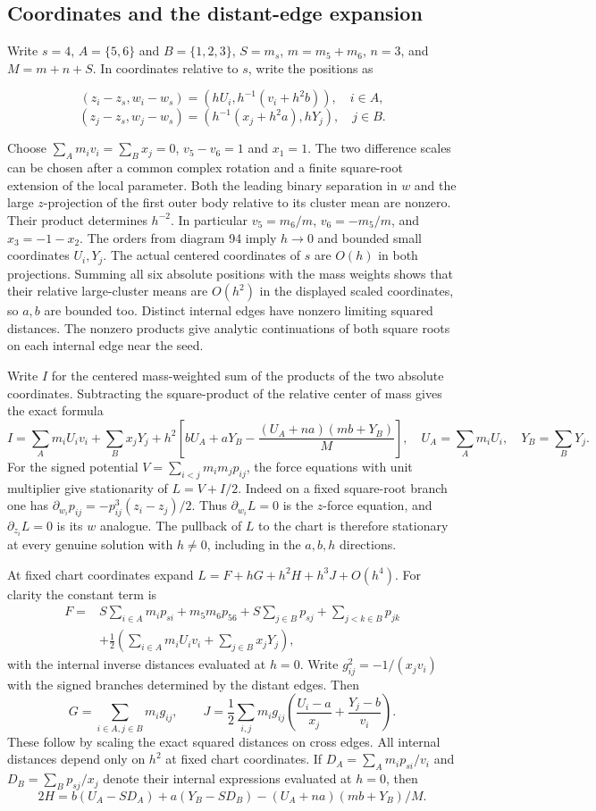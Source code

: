 \documentclass[11pt,letterpaper]{article}
\theoremstyle{definition}
\begin{document}
\subsection{Coordinates and the distant-edge expansion}
Write $s=4$, $A=\{5,6\}$ and $B=\{1,2,3\}$, $S=m_s$, $m=m_5+m_6$, $n=3$, and $M=m+n+S$. In coordinates relative to $s$, write the positions as

\[
(z_i-z_s,w_i-w_s)=(hU_i,h^{-1}(v_i+h^2b)),\quad i\in A,
\]
\[
(z_j-z_s,w_j-w_s)=(h^{-1}(x_j+h^2a),hY_j),\quad j\in B.
\]

Choose $\sum_A m_i v_i=\sum_B x_j=0$, $v_5-v_6=1$ and $x_1=1$. The two difference scales can be chosen after a common complex rotation and a finite square-root extension of the local parameter. Both the leading binary separation in $w$ and the large $z$-projection of the first outer body relative to its cluster mean are nonzero. Their product determines $h^{-2}$. In particular $v_5=m_6/m$, $v_6=-m_5/m$, and $x_3=-1-x_2$. The orders from diagram 94 imply $h\to0$ and bounded small coordinates $U_i,Y_j$. The actual centered coordinates of $s$ are $O(h)$ in both projections. Summing all six absolute positions with the mass weights shows that their relative large-cluster means are $O(h^2)$ in the displayed scaled coordinates, so $a,b$ are bounded too. Distinct internal edges have nonzero limiting squared distances. The nonzero products give analytic continuations of both square roots on each internal edge near the seed.

Write $I$ for the centered mass-weighted sum of the products of the two absolute coordinates. Subtracting the square-product of the relative center of mass gives the exact formula
\[
I=\sum_A m_i U_i v_i+\sum_B x_jY_j+
 h^2\left[bU_A+aY_B-\frac{(U_A+na)(mb+Y_B)}{M}\right],
\quad U_A=\sum_A m_iU_i,\quad Y_B=\sum_B Y_j.
\]
For the signed potential $V=\sum_{i<j}m_i m_jp_{ij}$, the force equations with unit multiplier give stationarity of $L=V+I/2$. Indeed on a fixed square-root branch one has $\partial_{w_i}p_{ij}=-p_{ij}^3(z_i-z_j)/2$. Thus $\partial_{w_i}L=0$ is the $z$-force equation, and $\partial_{z_i}L=0$ is its $w$ analogue. The pullback of $L$ to the chart is therefore stationary at every genuine solution with $h\ne0$, including in the $a,b,h$ directions.

At fixed chart coordinates expand $L=F+hG+h^2 H+h^3 J+O(h^4)$. For clarity the constant term is
\begin{align*}
 F={}& S\sum_{i\in A}m_i p_{si}+m_5m_6p_{56}
      +S\sum_{j\in B}p_{sj}+\sum_{j<k\in B}p_{jk}\\
    &+\tfrac12\left(\sum_{i\in A}m_iU_iv_i+\sum_{j\in B}x_jY_j\right),
\end{align*}
with the internal inverse distances evaluated at $h=0$. Write $g_{ij}^2=-1/(x_jv_i)$ with the signed branches determined by the distant edges. Then
\[
G=\sum_{i\in A,j\in B}m_i g_{ij},\qquad
J=\frac12\sum_{i,j}m_i g_{ij}
\left(\frac{U_i-a}{x_j}+\frac{Y_j-b}{v_i}\right).
\]
These follow by scaling the exact squared distances on cross edges. All internal distances depend only on $h^2$ at fixed chart coordinates. If $D_A=\sum_A m_i p_{si}/v_i$ and $D_B=\sum_B p_{sj}/x_j$ denote their internal expressions evaluated at $h=0$, then
\[
2H=b(U_A-SD_A)+a(Y_B-SD_B)-(U_A+na)(mb+Y_B)/M.
\]
\end{document}
